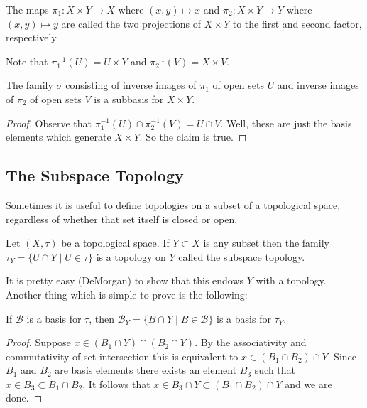 \begin{definition}
The maps $\pi_1:X \times Y \to X$ where $(x, y) \mapsto x$ and $\pi_2: X \times Y \to Y$ where $(x, y) \mapsto y$ are called the two projections of $X \times Y$ to the first and second factor, respectively.
\end{definition}

Note that $\pi_1^{-1}(U) = U \times Y$ and $\pi_2^{-1}(V) = X \times V$. 

\begin{proposition}
The family $\sigma$ consisting of inverse images of $\pi_1$ of open sets $U$ and inverse images of $\pi_2$ of open sets $V$ is a subbasis for $X \times Y$.
\end{proposition}

\begin{proof}
Observe that $\pi_1^{-1}(U) \cap \pi_2^{-1}(V) = U \cap V$. Well, these are just the basis elements which generate $X \times Y$. So the claim is true.
\end{proof}

\subsection{The Subspace Topology}

Sometimes it is useful to define topologies on a subset of a topological space, regardless of whether that set itself is closed or open.

\begin{definition}
Let $(X, \tau)$ be a topological space. If $Y \subset X$ is any subset then the family $\tau_Y = \{U \cap Y \mid U \in \tau\}$ is a topology on $Y$ called the subspace topology.
\end{definition}

It is pretty easy (DeMorgan) to show that this endows $Y$ with a topology. Another thing which is simple to prove is the following:

\begin{proposition}
If $\mathcal{B}$ is a basis for $\tau$, then $\mathcal{B}_Y = \{B \cap Y \mid B \in \mathcal{B}\}$ is a basis for $\tau_Y$.
\end{proposition}

\begin{proof}
Suppose $x \in (B_1 \cap Y) \cap (B_2 \cap Y)$. By the associativity and commutativity of set intersection this is equivalent to $x \in (B_1 \cap B_2) \cap Y$. Since $B_1$ and $B_2$ are basis elements there exists an element $B_3$ such that $x \in B_3 \subset B_1 \cap B_2$. It follows that $x \in B_3 \cap Y \subset (B_1 \cap B_2) \cap Y$ and we are done.
\end{proof}

